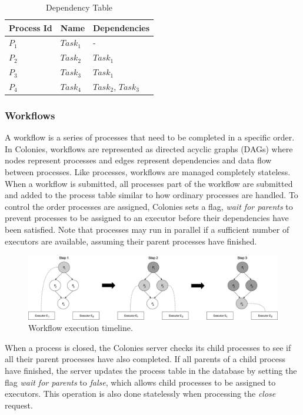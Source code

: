 \documentclass{article}
\begin{document}
\begin{table}[h]
	\caption{Dependency Table}
	\centering
	\begin{tabular}{lll}
		\toprule
		\cmidrule(r){1-2}
        Process Id & Name       & Dependencies           \\
		\midrule
        $P_{1}$    & $Task_{1}$ & -                      \\
        $P_{2}$    & $Task_{2}$ & $Task_{1}$             \\
        $P_{3}$    & $Task_{3}$ & $Task_{1}$             \\
        $P_{4}$    & $Task_{4}$ & $Task_{2}$, $Task_{3}$ \\
		\bottomrule
	\end{tabular}
	\label{deptable}
\end{table}

\subsubsection{Workflows}
A workflow is a series of processes that need to be completed in a specific order. In Colonies, workflows are represented as directed acyclic graphs (DAGs) where nodes represent processes and edges represent dependencies and data flow between processes. Like processes, workflows are managed completely stateless. When a workflow is submitted, all processes part of the workflow are submitted and added to the process table similar to how ordinary processes are handled. To control the order processes are assigned, Colonies sets a flag, \emph{wait for parents} to prevent processes to be assigned to an executor before their dependencies have been satisfied. Note that processes may run in parallel if a sufficient number of executors are available, assuming their parent processes have finished.

\begin{figure}[h]
	\centering
    \includegraphics[scale=0.30]{workflow.png}
	\caption{Workflow execution timeline.}
	\label{fig:workflowexec}
\end{figure}

When a process is closed, the Colonies server checks its child processes to see if all their parent processes have also completed. If all parents of a child process have finished, the server updates the process table in the database by setting the flag \emph{wait for parents} to \emph{false}, which allows child processes to be assigned to executors. This operation is also done statelessly when processing the \emph{close} request. 
\end{document}
